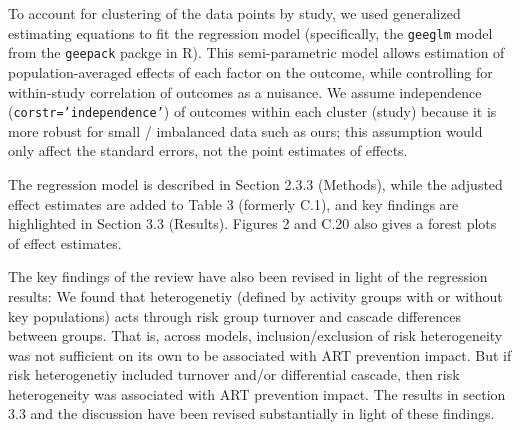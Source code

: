 \begin{comment}\label{reg.2}
A related concern is that the tests for statistically significant differences in the univariable analysis appear problematic. When you use the Kruskal-Wallis test you are assuming independence of observations. But here the observations are not statistically independent of one another - in many cases multiple observations are being taken from the same study (and there is likely to be a high degree of within-study correlation). By not taking into account the within-study correlation I think you exaggerate the significance of the differences between model types. That might explain some of the odd results in Table C1 (for example a statistically significant positive relationship between HCT behaviour change and the incidence reduction, but a significant negative relationship between HCT behaviour change and the cumulative \% of infections averted). If you use a meta-regression approach, you should be able to control for the within-study correlation.
\end{comment}
\begin{response}
To account for clustering of the data points by study, we used generalized estimating equations to fit the regression model
(specifically, the \texttt{geeglm} model from the \texttt{geepack} packge in R).
This semi-parametric model allows estimation of population-averaged effects of each factor on the outcome,
while controlling for within-study correlation of outcomes as a nuisance.
We assume independence (\texttt{corstr='independence'}) of outcomes within each cluster (study) because it is more robust for small / imbalanced data such as ours;
this assumption would only affect the standard errors, not the point estimates of effects.
\par
The regression model is described in Section 2.3.3 (Methods),
while the adjusted effect estimates are added to Table 3 (formerly C.1),
and key findings are highlighted in Section 3.3 (Results).
Figures 2 and C.20 also gives a forest plots of effect estimates.
\par
The key findings of the review have also been revised in light of the regression results:
We found that heterogenetiy (defined by activity groups with or without key populations)
acts through risk group turnover and cascade differences between groups.
That is, across models, inclusion/exclusion of risk heterogeneity was not sufficient on its own to be associated with ART prevention impact. 
But if risk heterogenetiy included turnover and/or differential cascade,
then risk heterogeneity was associated with ART prevention impact.
The results in section 3.3 and the discussion have been revised substantially in light of these findings.
\end{response}
